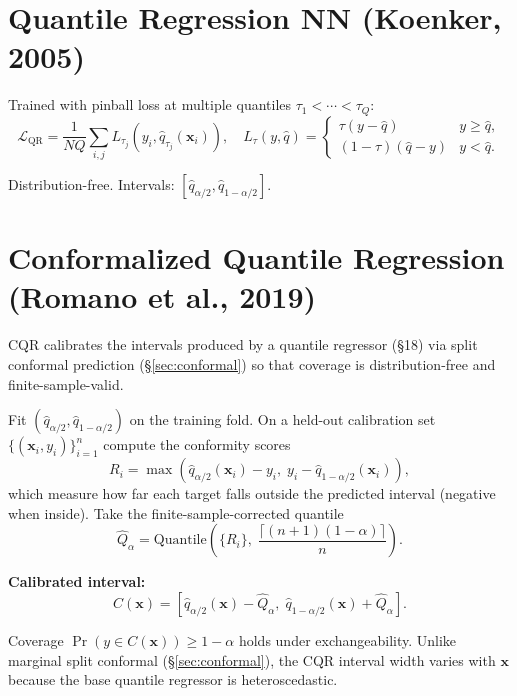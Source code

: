 \documentclass[11pt,a4paper]{article}
\theoremstyle{definition}
\newcommand{\bx}{\mathbf{x}}
\begin{document}
\section{Quantile Regression NN (Koenker, 2005)}

Trained with pinball loss at multiple quantiles $\tau_1 < \cdots < \tau_Q$:
\[
  \mathcal{L}_{\mathrm{QR}} = \frac{1}{NQ}\sum_{i,j} L_{\tau_j}(y_i, \hat{q}_{\tau_j}(\bx_i)),
  \quad
  L_\tau(y, \hat{q}) = \begin{cases}
    \tau(y - \hat{q}) & y \geq \hat{q}, \\
    (1-\tau)(\hat{q} - y) & y < \hat{q}.
  \end{cases}
\]

Distribution-free. Intervals: $[\hat{q}_{\alpha/2}, \hat{q}_{1-\alpha/2}]$.

\section{Conformalized Quantile Regression (Romano et al., 2019)}
\label{sec:cqr}

CQR calibrates the intervals produced by a quantile regressor (§18) via
split conformal prediction (§\ref{sec:conformal}) so that coverage is
distribution-free and finite-sample-valid.

Fit $(\hat{q}_{\alpha/2}, \hat{q}_{1-\alpha/2})$ on the training fold.
On a held-out calibration set $\{(\bx_i, y_i)\}_{i=1}^{n}$ compute the
conformity scores
\begin{equation}
  R_i = \max\!\left(\hat{q}_{\alpha/2}(\bx_i) - y_i,\; y_i - \hat{q}_{1-\alpha/2}(\bx_i)\right),
  \label{eq:cqr_score}
\end{equation}
which measure how far each target falls outside the predicted interval
(negative when inside). Take the finite-sample-corrected quantile
\[
  \hat{Q}_\alpha = \text{Quantile}\!\left(\{R_i\}, \; \frac{\lceil (n+1)(1-\alpha) \rceil}{n}\right).
\]

\textbf{Calibrated interval:}
\[
  C(\bx) = \left[\hat{q}_{\alpha/2}(\bx) - \hat{Q}_\alpha,\; \hat{q}_{1-\alpha/2}(\bx) + \hat{Q}_\alpha\right].
\]

Coverage $\Pr(y \in C(\bx)) \geq 1 - \alpha$ holds under exchangeability.
Unlike marginal split conformal (§\ref{sec:conformal}), the CQR interval
width varies with $\bx$ because the base quantile regressor is
heteroscedastic.
\end{document}
